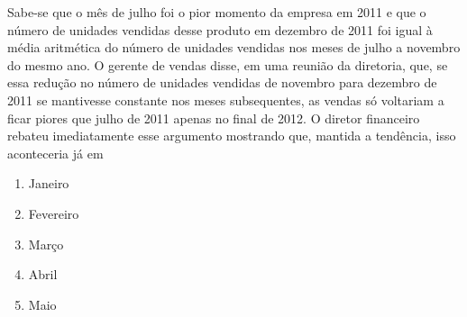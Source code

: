 \begin{enumerate}
\begin{center}
  \end{center}

  
  Sabe-se que o mês de julho foi o pior momento da empresa em 2011 e que o número de unidades vendidas desse produto em dezembro de 2011 foi igual à média aritmética do número de unidades vendidas nos meses de julho a novembro do mesmo ano. O gerente de vendas disse, em uma reunião da diretoria, que, se essa redução no número de unidades vendidas de novembro para dezembro de 2011 se mantivesse constante nos meses subsequentes, as vendas só voltariam a ficar piores que julho de 2011 apenas no final de 2012. O diretor financeiro rebateu imediatamente esse argumento mostrando que, mantida a tendência, isso aconteceria já em

  \begin{enumerate}
  \item Janeiro
  \item Fevereiro
  \item Março
  \item Abril
  \item Maio
  \end{enumerate}
\end{enumerate}
